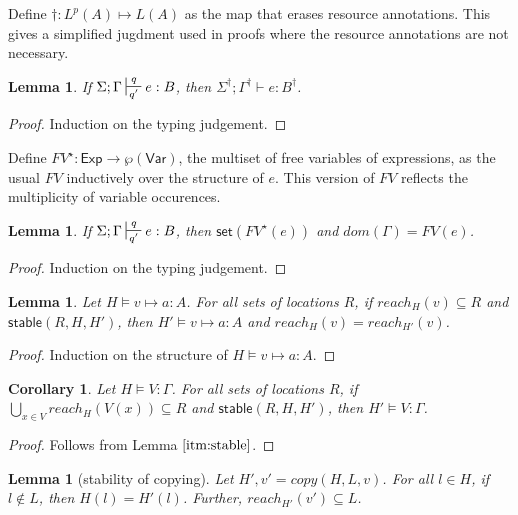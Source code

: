 \documentclass{easychair}
\newcommand{\ms}[1]{\ensuremath{\mathsf{#1}}}
\newcommand{\stable}[1]{\mathsf{stable}(#1)}
\newcommand{\set}[1]{\mathsf{set}(#1)}
\newtheorem{lemma}[theorem]{Lemma}
\newtheorem{corollary}[theorem]{Corollary}
\theoremstyle{definition}
\begin{document}
Define $\dagger :  L^p(A) \mapsto L(A)$ as the map that erases resource annotations. 
This gives a simplified jugdment 
used in proofs where the resource annotations are not necessary.

\begin{lemma}
\label{a} If $\Sigma; \Gamma \sststile{q'}{q} e : B$, then $\Sigma^{\dagger}; \Gamma^{\dagger} \vdash e : B^{\dagger}$.
\end{lemma}

\begin{proof}
Induction on the typing judgement.
\end{proof}

Define $FV^{\star} : \ms{Exp} \to \wp(\ms{Var})$, the multiset of free variables of expressions,
as the usual $FV$ inductively over the structure of $e$. This version of $FV$ reflects 
the multiplicity of variable occurences.

\begin{lemma}\label{itm:linear}
\label{a} If $\Sigma; \Gamma \sststile{q'}{q} e : B$, then $\set{FV^{\star}(e)}$ and $dom(\Gamma) = FV(e)$.
\end{lemma}

\begin{proof}
Induction on the typing judgement.
\end{proof}

\begin{lemma}\label{itm:stable}
Let $H \vDash v \mapsto a : A$. For all sets of locations $R$, if $reach_H(v) \subseteq R$ and $\stable{R,H,H'}$, then $H' \vDash v \mapsto a : A$ and $reach_H(v) = reach_{H'}(v)$.
\end{lemma}

\begin{proof}
Induction on the structure of $H \vDash v \mapsto a : A$.
\end{proof}

\begin{corollary}
Let $H \vDash V : \Gamma$. For all sets of locations $R$, if $\bigcup_{x \in V} reach_H(V(x)) \subseteq R$ and $\stable{R,H,H'}$, then $H' \vDash V : \Gamma$.
\end{corollary}

\begin{proof}
Follows from Lemma $\ref{itm:stable}$.
\end{proof}


\begin{lemma}[stability of copying]\label{itm:copyStable}
	Let $H',v' = copy(H,L,v)$. For all $l \in H$, if $l \notin L$, then $H(l) = H'(l)$. 
	Further, $reach_{H'}(v') \subseteq L$.
\end{lemma}
\end{document}
